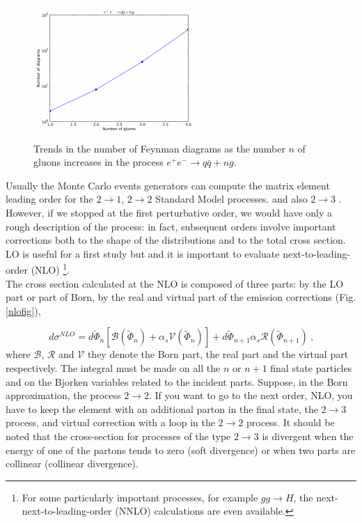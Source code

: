 \begin{figure}[h]
\centering
\includegraphics[scale= 2.5]{../Cap3/Fig_MC/fattoriale}
\caption{ Trends in the number of Feynman diagrams as the number $ n $ of gluons increases in the process $e^+ e^- \rightarrow q \bar{q} + ng$.}
\label{fatt}
\end{figure}
Usually the  Monte Carlo events generators can compute the matrix element leading order for the $2 \rightarrow 1$,  $2 \rightarrow 2$  Standard Model processes.  
and also  $2 \rightarrow 3$ \cite{bib:madgraph}.  \\
However, if we stopped at the first perturbative order, we would have only a rough description of the process: in fact, subsequent orders involve important corrections both to the shape of the distributions and to the total cross section. LO is useful for a first study but and it is important to evaluate next-to-leading-order (NLO) \footnote{For some particularly important processes, for example $ gg \rightarrow H $, the next-next-to-leading-order (NNLO) calculations are even available.}. \\
The cross section calculated at the NLO is composed of three parts: by the LO part or part of Born, by the real and virtual part of the emission corrections (Fig. \ref{nlofig}),

\begin{equation}
 \label{xsecNLO}
 d\sigma^{NLO} =  d \tilde{\Phi}_n [\mathcal{B} (  \tilde{\Phi}_n  ) + \alpha_s \mathcal{V}(  \tilde{\Phi}_n  ) ] +  d \tilde{\Phi}_{n+1} \alpha_s \mathcal{R}(\tilde{\Phi}_{n+1}  ) \: \mbox{,}   \end{equation}
 where $\mathcal{B}$, $\mathcal{R}$ and $\mathcal{V}$ they denote the Born part, the real part and the virtual part respectively. The integral must be made on all the $ n $ or $ n + 1 $ final state particles and on the Bjorken variables related to the incident parts.
Suppose, in the Born approximation, the process  $ 2 \rightarrow 2 $. If you want to go to the next order, NLO, you have to keep the element with an additional parton in the final state, the $ 2 \rightarrow 3 $ process, and virtual correction with a loop in the $ 2 \rightarrow 2 $ process.
It should be noted that the cross-section for processes of the type $ 2 \rightarrow 3 $ is divergent when the energy of one of the partons tends to zero (soft divergence) or when two parts are collinear (collinear divergence).


